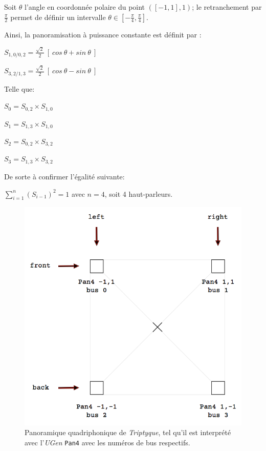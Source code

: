 \bigskip

Soit $\theta$ l'angle en coordonn\'ee polaire du point $([-1,1],1)$; le retranchement par $\frac{\pi}{2}$ permet de d\'efinir un intervalle  $\theta \in [ - \frac{\pi}{4}, \frac{\pi}{4}]$.

\smallskip

\noindent Ainsi, la panoramisation \`a puissance constante est d\'efinit par \citep[ p. 134]{cr}:
\smallskip

$S_{1,0/0,2} = \frac{\sqrt{2}}{2} \: [ \: cos \: \theta + sin \: \theta \: ]$

$S_{3,2/1,3} = \frac{\sqrt{2}}{2} \: [ \: cos \: \theta - sin \: \theta \: ]$

\smallskip

\noindent Telle que:

$S_0=S_{0,2} \times S_{1,0}$

$S_1=S_{1,3} \times S_{1,0}$

$S_2=S_{0,2} \times S_{3,2}$

$S_3=S_{1,3} \times S_{3,2}$

\smallskip

\noindent De sorte \`a confirmer l'\'egalit\'e suivante:

\smallskip

$\displaystyle \sum_{i=1}^{n} (S_{i-1})^2 =1$ avec $n=4$, soit 4 haut-parleurs. 

 \begin{figure}[H]
\begin{center}
\includegraphics[scale=0.5]{img/6643}
\caption{Panoramique quadriphonique de \textit{Triptyque}, tel qu'il est interpr\'et\'e avec l'\textit{UGen} \texttt{Pan4} avec les num\'eros de bus respectifs. }
\label{pan}
\end{center}
\end{figure}

